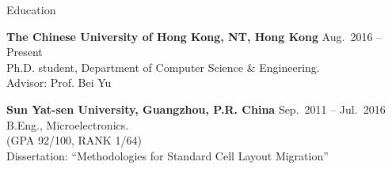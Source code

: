 

\begin{rSection}{Education}



{\bf The Chinese University of Hong Kong, NT, Hong Kong} \hfill { Aug.~2016 -- Present}\\
Ph.D. student, Department of Computer Science \& Engineering. \\
Advisor: Prof. Bei Yu

{\bf Sun Yat-sen University, Guangzhou, P.R. China} \hfill { Sep.~2011 -- Jul.~2016}\\
B.Eng., Microelectronics.\\
(GPA 92/100, RANK 1/64) \\
Dissertation: ``Methodologies for Standard Cell Layout Migration''
\end{rSection}


